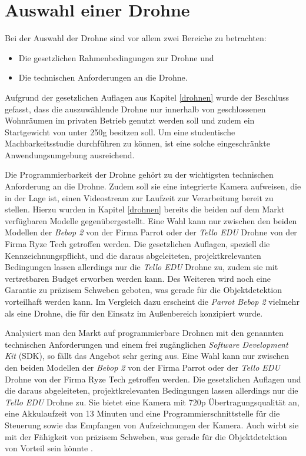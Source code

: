 \section{Auswahl einer Drohne} \label{drone_selection}

Bei der Auswahl der Drohne sind vor allem zwei Bereiche zu betrachten:

\begin{itemize}
	\item Die gesetzlichen Rahmenbedingungen zur Drohne und
	\item Die technischen Anforderungen an die Drohne.
\end{itemize}

Aufgrund der gesetzlichen Auflagen aus Kapitel \ref{drohnen} wurde der Beschluss gefasst, dass die auszuwählende Drohne nur innerhalb von geschlossenen Wohnräumen im privaten Betrieb genutzt werden soll und zudem ein Startgewicht von unter 250g besitzen soll. Um eine studentische Machbarkeitsstudie durchführen zu können, ist eine solche eingeschränkte Anwendungsumgebung ausreichend. 

Die Programmierbarkeit der Drohne gehört zu der wichtigsten technischen Anforderung an die Drohne. Zudem soll sie eine integrierte Kamera aufweisen, die in der Lage ist, einen Videostream zur Laufzeit zur Verarbeitung bereit zu stellen. Hierzu wurden in Kapitel \ref{drohnen} bereits die beiden auf dem Markt verfügbaren Modelle  gegenübergestellt. Eine Wahl kann nur zwischen den beiden Modellen der \textit{Bebop 2} von der Firma Parrot oder der \textit{Tello EDU} Drohne von der Firma Ryze Tech getroffen werden. Die gesetzlichen Auflagen, speziell die Kennzeichnungspflicht, und die daraus abgeleiteten, projektkrelevanten Bedingungen lassen allerdings nur die \textit{Tello EDU} Drohne zu, zudem sie mit vertretbaren Budget erworben werden kann. Des Weiteren wird noch eine Garantie zu präzisem Schweben geboten, was gerade für die Objektdetektion vorteilhaft werden kann. Im Vergleich dazu erscheint die \textit{Parrot Bebop 2} vielmehr als eine Drohne, die für den Einsatz im Außenbereich konzipiert wurde.

Analysiert man den Markt auf programmierbare Drohnen mit den genannten technischen Anforderungen und einem frei zugänglichen \textit{Software Development Kit} (SDK), so fällt das Angebot sehr gering aus. Eine Wahl kann nur zwischen den beiden Modellen der \textit{Bebop 2} von der Firma Parrot oder der \textit{Tello EDU} Drohne von der Firma Ryze Tech getroffen werden. Die gesetzlichen Auflagen und die daraus abgeleiteten, projektkrelevanten Bedingungen lassen allerdings nur die \textit{Tello EDU} Drohne zu. Sie bietet eine Kamera mit 720p Übertragungsqualität an, eine Akkulaufzeit von 13 Minuten und eine Programmierschnittstelle für die Steuerung sowie das Empfangen von Aufzeichnungen der Kamera. Auch wirbt sie mit der Fähigkeit von präzisem Schweben, was gerade für die Objektdetektion von Vorteil sein könnte \cite{RyzeRobotics.2020}.
